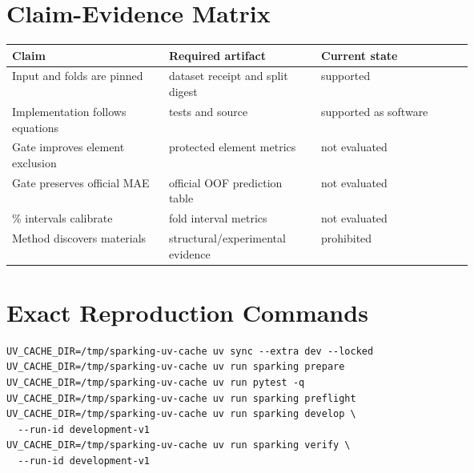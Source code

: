 \documentclass[11pt]{article}
\begin{document}
\section{Claim-Evidence Matrix}
\begin{tabularx}{\linewidth}{>{\raggedright\arraybackslash}p{0.34\linewidth}>{\raggedright\arraybackslash}p{0.33\linewidth}>{\raggedright\arraybackslash}X}
\toprule
Claim & Required artifact & Current state \\
\midrule
Input and folds are pinned & dataset receipt and split digest & supported \\
Implementation follows equations & tests and source & supported as software \\
Gate improves element exclusion & protected element metrics & not evaluated \\
Gate preserves official MAE & official OOF prediction table & not evaluated \\
90\% intervals calibrate & fold interval metrics & not evaluated \\
Method discovers materials & structural/experimental evidence & prohibited \\
\bottomrule
\end{tabularx}

\section{Exact Reproduction Commands}
\begin{verbatim}
UV_CACHE_DIR=/tmp/sparking-uv-cache uv sync --extra dev --locked
UV_CACHE_DIR=/tmp/sparking-uv-cache uv run sparking prepare
UV_CACHE_DIR=/tmp/sparking-uv-cache uv run pytest -q
UV_CACHE_DIR=/tmp/sparking-uv-cache uv run sparking preflight
UV_CACHE_DIR=/tmp/sparking-uv-cache uv run sparking develop \
  --run-id development-v1
UV_CACHE_DIR=/tmp/sparking-uv-cache uv run sparking verify \
  --run-id development-v1
\end{verbatim}
\end{document}
